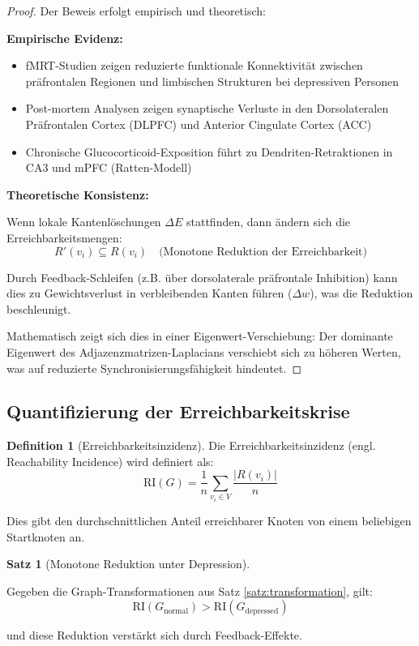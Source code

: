 \documentclass[a4paper,12pt]{article}
\theoremstyle{definition}
\newtheorem{definition}{Definition}
\newtheorem{satz}{Satz}
\begin{document}
\begin{proof}
Der Beweis erfolgt empirisch und theoretisch:

\textbf{Empirische Evidenz:}
\begin{itemize}
	\item fMRT-Studien zeigen reduzierte funktionale Konnektivität zwischen präfrontalen Regionen und limbischen Strukturen bei depressiven Personen \cite{hamilton2013}
	\item Post-mortem Analysen zeigen synaptische Verluste in den Dorsolateralen Präfrontalen Cortex (DLPFC) und Anterior Cingulate Cortex (ACC) \cite{rajkowska2005}
	\item Chronische Glucocorticoid-Exposition führt zu Dendriten-Retraktionen in CA3 und mPFC (Ratten-Modell) \cite{watanabe2010}
\end{itemize}

\textbf{Theoretische Konsistenz:}

Wenn lokale Kantenlöschungen $\Delta E$ stattfinden, dann ändern sich die Erreichbarkeitsmengen:
\[
R'(v_i) \subseteq R(v_i) \quad \text{(Monotone Reduktion der Erreichbarkeit)}
\]

Durch Feedback-Schleifen (z.B. über dorsolaterale präfrontale Inhibition) kann dies zu Gewichtsverlust in verbleibenden Kanten führen ($\Delta w$), was die Reduktion beschleunigt.

Mathematisch zeigt sich dies in einer Eigenwert-Verschiebung: Der dominante Eigenwert des Adjazenzmatrizen-Laplacians verschiebt sich zu höheren Werten, was auf reduzierte Synchronisierungsfähigkeit hindeutet.
\end{proof}

\subsection{Quantifizierung der Erreichbarkeitskrise}

\begin{definition}[Erreichbarkeitsinzidenz]
Die Erreichbarkeitsinzidenz (engl. Reachability Incidence) wird definiert als:
\[
\text{RI}(G) = \frac{1}{n} \sum_{v_i \in V} \frac{|R(v_i)|}{n}
\]

Dies gibt den durchschnittlichen Anteil erreichbarer Knoten von einem beliebigen Startknoten an.
\end{definition}

\begin{satz}[Monotone Reduktion unter Depression]
\label{satz:monoton}

Gegeben die Graph-Transformationen aus Satz \ref{satz:transformation}, gilt:
\[
\text{RI}(G_{\text{normal}}) > \text{RI}(G_{\text{depressed}})
\]

und diese Reduktion verstärkt sich durch Feedback-Effekte.
\end{satz}
\end{document}
